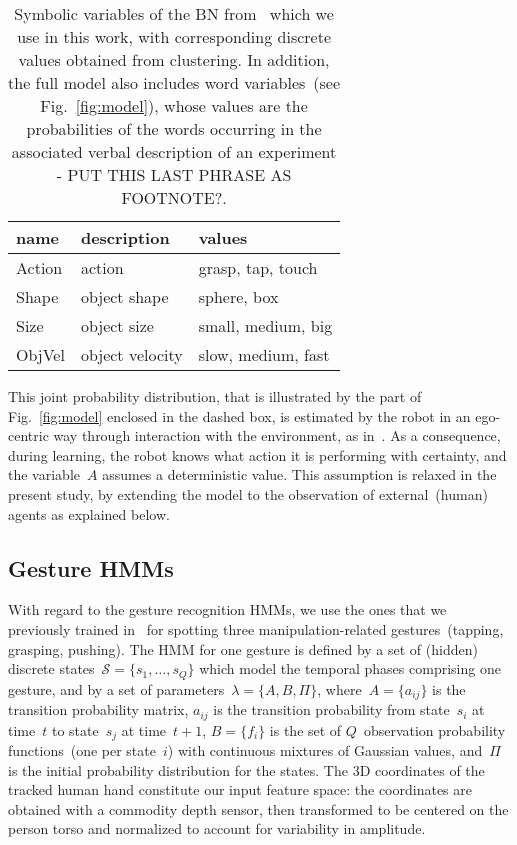 \begin{table}
    \centering
    \caption{Symbolic variables of the \acl{BN} from~\cite{salvi:2012:smcb} which we use in this work, with corresponding discrete values obtained from clustering. In addition, the full model also includes word variables~(see Fig.~\ref{fig:model}), whose values are the probabilities of the words occurring in the associated verbal description of an experiment - PUT THIS LAST PHRASE AS FOOTNOTE?.}
    \label{tab:bnsymb}
    \begin{tabular}{*{3}{l}} %
    \toprule
    name   & description     & values \\
    \midrule
    Action & action          & grasp, tap, touch \\
    Shape  & object shape    & sphere, box \\
    Size   & object size     & small, medium, big \\
    ObjVel & object velocity & slow, medium, fast \\
    \bottomrule
    \end{tabular}
\end{table}

This joint probability distribution, that is illustrated by the part of Fig.~\ref{fig:model} enclosed in the dashed box, is estimated by the robot in an ego-centric way through interaction with the environment, as in~\cite{salvi:2012:smcb}. As a consequence, during learning, the robot knows what action it is performing with certainty, and the variable~$A$ assumes a deterministic value. This assumption is relaxed in the present study, by extending the model to the observation of external~(human) agents as explained below.

\subsection{Gesture \aclp{HMM}}

With regard to the gesture recognition \acsp{HMM}, we use the ones that we previously trained in~\cite{saponaro:2013:crhri} for spotting three manipulation-related gestures~(tapping, grasping, pushing). The \ac{HMM} for one gesture is defined by a set of (hidden) discrete states~$\mathcal{S} = \{s_1, \dots, s_Q\}$ which model the temporal phases comprising one gesture, and by a set of parameters~$\lambda = \{ A, B, \Pi \}$, where~$A = \{ a_{ij} \}$ is the transition probability matrix, $a_{ij}$ is the transition probability from state~$s_i$ at time~$t$ to state~$s_j$ at time~$t+1$, $B = \{ f_i \}$ is the set of $Q$~observation probability functions~(one per state~$i$) with continuous mixtures of Gaussian values, and~$\Pi$ is the initial probability distribution for the states. The 3D coordinates of the tracked human hand constitute our input feature space: the coordinates are obtained with a commodity depth sensor, then transformed to be centered on the person torso and normalized to account for variability in amplitude.


